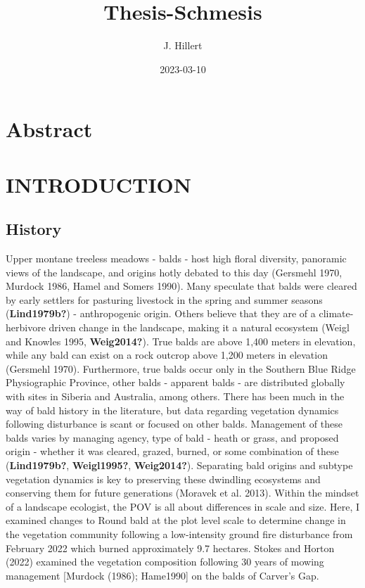 \documentclass[
]{article}
\title{Thesis-Schmesis}
\author{J. Hillert}
\date{2023-03-10}
\begin{document}
\maketitle

{
\setcounter{tocdepth}{2}
\tableofcontents
}
\hypertarget{abstract}{%
\section{Abstract}\label{abstract}}

\hypertarget{introduction}{%
\section{INTRODUCTION}\label{introduction}}

\hypertarget{history}{%
\subsection{History}\label{history}}

Upper montane treeless meadows - balds - host high floral diversity, panoramic views of the landscape, and origins hotly debated to this day (Gersmehl 1970, Murdock 1986, Hamel and Somers 1990). Many speculate that balds were cleared by early settlers for pasturing livestock in the spring and summer seasons (\textbf{Lind1979b?}) - anthropogenic origin. Others believe that they are of a climate-herbivore driven change in the landscape, making it a natural ecosystem (Weigl and Knowles 1995, \textbf{Weig2014?}). True balds are above 1,400 meters in elevation, while any bald can exist on a rock outcrop above 1,200 meters in elevation (Gersmehl 1970). Furthermore, true balds occur only in the Southern Blue Ridge Physiographic Province, other balds - apparent balds - are distributed globally with sites in Siberia and Australia, among others. There has been much in the way of bald history in the literature, but data regarding vegetation dynamics following disturbance is scant or focused on other balds. Management of these balds varies by managing agency, type of bald - heath or grass, and proposed origin - whether it was cleared, grazed, burned, or some combination of these (\textbf{Lind1979b?}, \textbf{Weigl1995?}, \textbf{Weig2014?}). Separating bald origins and subtype vegetation dynamics is key to preserving these dwindling ecosystems and conserving them for future generations (Moravek et al. 2013). Within the mindset of a landscape ecologist, the POV is all about differences in scale and size. Here, I examined changes to Round bald at the plot level scale to determine change in the vegetation community following a low-intensity ground fire disturbance from February 2022 which burned approximately 9.7 hectares. Stokes and Horton (2022) examined the vegetation composition following 30 years of mowing management {[}Murdock (1986); Hame1990{]} on the balds of Carver's Gap.
\end{document}
